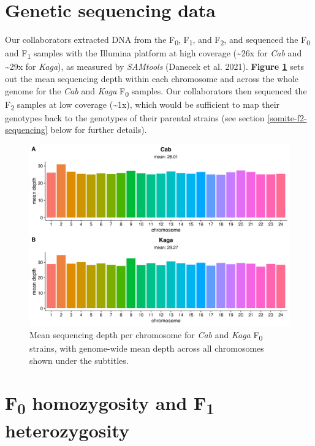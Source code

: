 \documentclass[
]{book}
\begin{document}
\clearpage

\hypertarget{genetic-sequencing-data}{%
\section{Genetic sequencing data}\label{genetic-sequencing-data}}

Our collaborators extracted DNA from the F\textsubscript{0}, F\textsubscript{1}, and F\textsubscript{2}, and sequenced the F\textsubscript{0} and F\textsubscript{1} samples with the Illumina platform at high coverage (\textasciitilde26x for \emph{Cab} and \textasciitilde29x for \emph{Kaga}), as measured by \emph{SAMtools} (Danecek et al. 2021). \textbf{Figure \ref{fig:F0-coverage}} sets out the mean sequencing depth within each chromosome and across the whole genome for the \emph{Cab} and \emph{Kaga} F\textsubscript{0} samples. Our collaborators then sequenced the F\textsubscript{2} samples at low coverage (\textasciitilde1x), which would be sufficient to map their genotypes back to the genotypes of their parental strains (see section \ref{somite-f2-sequencing} below for further details).



\begin{figure}
\includegraphics[width=1\linewidth]{figs/somites/F0_coverage} \caption{Mean sequencing depth per chromosome for \emph{Cab} and \emph{Kaga} F\textsubscript{0} strains, with genome-wide mean depth across all chromosomes shown under the subtitles.}\label{fig:F0-coverage}
\end{figure}

\clearpage

\hypertarget{f0-homozygosity-and-f1-heterozygosity}{%
\section{\texorpdfstring{F\textsubscript{0} homozygosity and F\textsubscript{1} heterozygosity}{F0 homozygosity and F1 heterozygosity}}\label{f0-homozygosity-and-f1-heterozygosity}}
\end{document}
